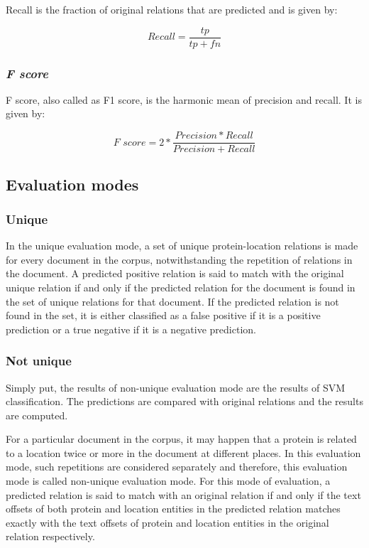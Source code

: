 Recall is the fraction of original relations that are predicted and is given by:

$$
\textit{Recall} = \frac{tp}{tp+fn}
$$

\subsubsection*{\textit{F score}}\label{subsubsec:Fscore}

F score, also called as F1 score, is the harmonic mean of precision and recall. It is given by:

$$
\textit{F score} = 2 * \frac{Precision * Recall}{Precision + Recall}
$$



\subsection{Evaluation modes} \label{subsec:Eval}

\subsubsection{Unique}\label{subsubsec:UniqEval}

In the unique evaluation mode, a set of unique protein-location relations is made for every document in the corpus, notwithstanding the repetition of relations in the document. A predicted positive relation is said to match with the original unique relation if and only if the predicted relation for the document is found in the set of unique relations for that document. If the predicted relation is not found in the set, it is either classified as a false positive if it is a positive prediction or a true negative if it is a negative prediction.


\subsubsection{Not unique}\label{subsubsec:NonUniqEval}

Simply put, the results of non-unique evaluation mode are the results of SVM classification. The predictions are compared with original relations and the results are computed.

For a particular document in the corpus, it may happen that a protein is related to a location twice or more in the document at different places. In this evaluation mode,  such repetitions are considered separately and therefore, this evaluation mode is called non-unique evaluation mode. For this mode of evaluation, a predicted relation is said to match with an original relation if and only if the text offsets of both protein and location entities in the predicted relation matches exactly with the text offsets of protein and location entities in the original relation respectively.

